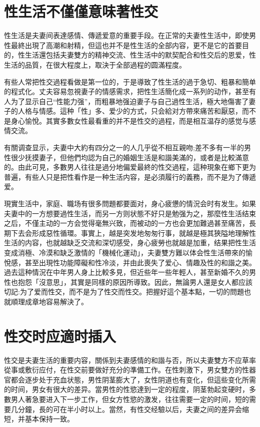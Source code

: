 \documentclass[12pt,UTF8]{ctexbook}
\begin{document}
\section{性生活不僅僅意味著性交}

性生活是夫妻间表達感情、傳遞爱意的重要手段。在正常的夫妻性生活中，即使男性最終出現了高潮和射精，但這也并不是性生活的全部内容，更不是它的首要目的，性生活還包括夫妻雙方的精神交流、性生活中的默契配合和性交后的恩爱，性生活的品質，在很大程度上，取決于全部過程的圆滿程度。

有些人常把性交過程看做是第一位的，于是導致了性生活的過于急切、粗暴和簡单的程式化。丈夫容易忽視妻子的情感需求，把性生活簡化成一系列的动作，甚至有人为了显示自己“性能力强”，而粗暴地强迫妻子与自己過性生活，極大地傷害了妻子的人格与情感。這种「性」多、爱少的方式，只会給对方帶來痛苦和厭惡，而不是身心愉悅。其實多數女性最看重的并不是性交的過程，而是相互温存的感觉与感情交流。

有關调查显示，夫妻中大約有四分之一的人几乎從不相互親吻;差不多有一半的男性很少抚摸妻子，但他們均認为自己的婚姻生活是和諧美滿的，或者是比較滿意的。由此可見，多數男人往往是過分地偏爱最終的性交過程，這种現象在鄉下更为普遍，有些人只是把性看作是一种生活内容，是必須履行的義務，而不是为了傳遞爱。

現實生活中，家庭、職场有很多問題都要面对，身心疲憊的情況会时有发生。如果夫妻中的一方想要過性生活，而另一方则状態不好只是勉强为之，那麼性生活结束之后，不僅主动的一方会觉得毫無兴致，而被动的一方也会更加難過甚至痛苦，長期下去会形成惡性循環。事實上，越是突发地匆匆行事，就越是極其狹隘地理解性生活的内容，也就越缺乏交流和深切感受，身心疲勞也就越是加重，结果把性生活变成消極、冷漠和缺乏激情的「機械化運动」，夫妻雙方難以体会性生活帶來的愉悅感，甚至出現性功能障礙和性冷淡，并由此喪失了爱心、情趣及性的和諧之美。過去這种情況在中年男人身上比較多見，但近些年一些年輕人，甚至新婚不久的男性也抱怨「沒意思」，其實是同樣的原因所導致。因此，無論男人還是女人都应該切記:为了爱而性交，而不是为了性交而性交。把握好這个基本點，一切的問題也就順理成章地容易解決了。

\section{性交时应適时插入}

性交是夫妻生活的重要内容，關係到夫妻感情的和諧与否，所以夫妻雙方不应草率從事或敷衍应付，在性交前要做好充分的準備工作。在性刺激下，男女雙方的性器官都会逐步处于充血状態，男性阴茎膨大了，女性阴道也有变化，但這些变化所需的时间，男女有很大的差异。當男性的性慾達到一定的程度，阴茎勃起变硬时，多數男人著急要进入下一步工作，但女方性慾的激发，往往需要一定的时间，短的需要几分鐘，長的可在半小时以上。當然，有性交经驗以后，夫妻之间的差异会缩短，并基本保持一致。
\end{document}
